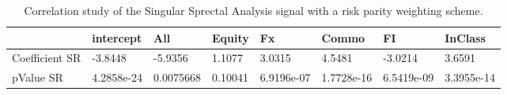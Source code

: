 \begin{table}[H]
\centering
\begin{tabular}{llllllll}
& intercept & All & Equity & Fx & Commo & FI & InClass \\ 
\hline 
Coefficient SR & -3.8448 & -5.9356 & 1.1077 & 3.0315 & 4.5481 & -3.0214 & 3.6591 \\ 
pValue SR & 4.2858e-24 & 0.0075668 & 0.10041 & 6.9196e-07 & 1.7728e-16 & 6.5419e-09 & 3.3955e-14 \\ 
\hline
\end{tabular}
\caption{Correlation study of the Singular Sprectal Analysis signal with a risk parity weighting scheme.}
\label{SSA_RP_CORR}
\end{table}